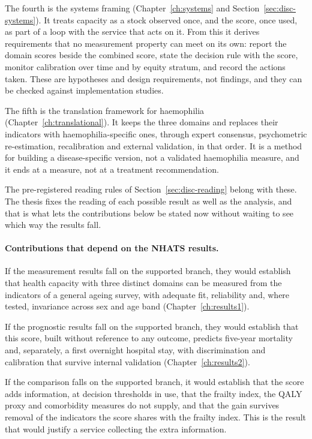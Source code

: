 The fourth is the systems framing (Chapter~\ref{ch:systems} and
Section~\ref{sec:disc-systems}). It treats capacity as a stock observed once, and
the score, once used, as part of a loop with the service that acts on it. From
this it derives requirements that no measurement property can meet on its own:
report the domain scores beside the combined score, state the decision rule with
the score, monitor calibration over time and by equity stratum, and record the
actions taken. These are hypotheses and design requirements, not findings, and
they can be checked against implementation studies.

The fifth is the translation framework for haemophilia
(Chapter~\ref{ch:translational}). It keeps the three domains and replaces their
indicators with haemophilia-specific ones, through expert consensus,
psychometric re-estimation, recalibration and external validation, in that order.
It is a method for building a disease-specific version, not a validated
haemophilia measure, and it ends at a measure, not at a treatment recommendation.

The pre-registered reading rules of Section~\ref{sec:disc-reading} belong with
these. The thesis fixes the reading of each possible result as well as the
analysis, and that is what lets the contributions below be stated now without
waiting to see which way the results fall.

\paragraph{Contributions that depend on the NHATS results.}
If the measurement results fall on the supported branch, they would establish
that health capacity with three distinct domains can be measured from the
indicators of a general ageing survey, with adequate fit, reliability and, where
tested, invariance across sex and age band (Chapter~\ref{ch:results1}).

If the prognostic results fall on the supported branch, they would establish that
this score, built without reference to any outcome, predicts five-year mortality
and, separately, a first overnight hospital stay, with discrimination and
calibration that survive internal validation (Chapter~\ref{ch:results2}).

If the comparison falls on the supported branch, it would establish that the
score adds information, at decision thresholds in use, that the frailty index,
the QALY proxy and comorbidity measures do not supply, and that the gain survives
removal of the indicators the score shares with the frailty index. This is the
result that would justify a service collecting the extra information.


